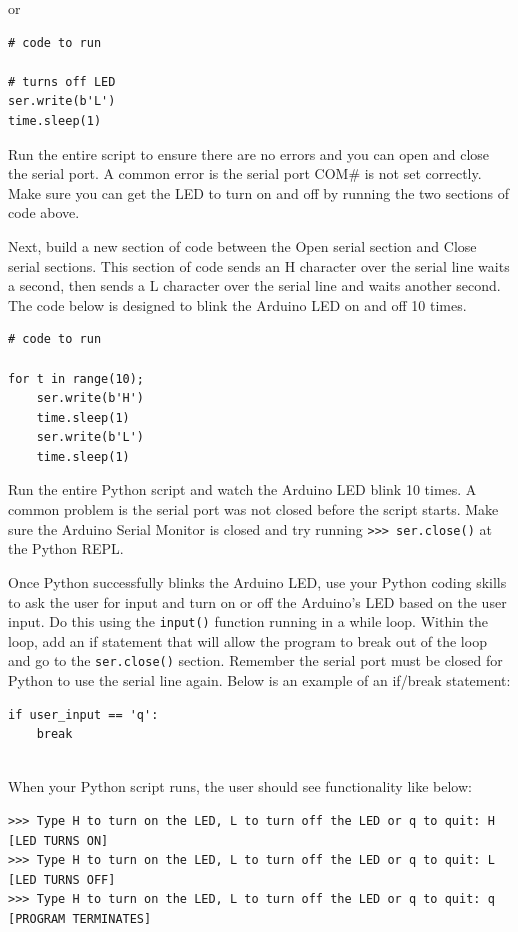 \documentclass[11pt]{article}
\begin{document}
or

\begin{verbatim}
# code to run

# turns off LED
ser.write(b'L')
time.sleep(1)
\end{verbatim}

Run the entire script to ensure there are no errors and you can open and
close the serial port. A common error is the serial port COM\# is not
set correctly. Make sure you can get the LED to turn on and off by
running the two sections of code above.

Next, build a new section of code between the Open serial section and
Close serial sections. This section of code sends an H character over
the serial line waits a second, then sends a L character over the serial
line and waits another second. The code below is designed to blink the
Arduino LED on and off 10 times.

\begin{verbatim}
# code to run

for t in range(10);
    ser.write(b'H')
    time.sleep(1)
    ser.write(b'L')
    time.sleep(1)
\end{verbatim}

    Run the entire Python script and watch the Arduino LED blink 10 times. A
common problem is the serial port was not closed before the script
starts. Make sure the Arduino Serial Monitor is closed and try running
\texttt{\textgreater{}\textgreater{}\textgreater{}\ ser.close()} at the
Python REPL.

Once Python successfully blinks the Arduino LED, use your Python coding
skills to ask the user for input and turn on or off the Arduino's LED
based on the user input. Do this using the \texttt{input()} function
running in a while loop. Within the loop, add an if statement that will
allow the program to break out of the loop and go to the
\texttt{ser.close()} section. Remember the serial port must be closed
for Python to use the serial line again. Below is an example of an
if/break statement:

\begin{verbatim}
if user_input == 'q':
    break
    
\end{verbatim}

When your Python script runs, the user should see functionality like
below:

\begin{verbatim}
>>> Type H to turn on the LED, L to turn off the LED or q to quit: H
[LED TURNS ON]
>>> Type H to turn on the LED, L to turn off the LED or q to quit: L
[LED TURNS OFF]
>>> Type H to turn on the LED, L to turn off the LED or q to quit: q
[PROGRAM TERMINATES]
\end{verbatim}
\end{document}
